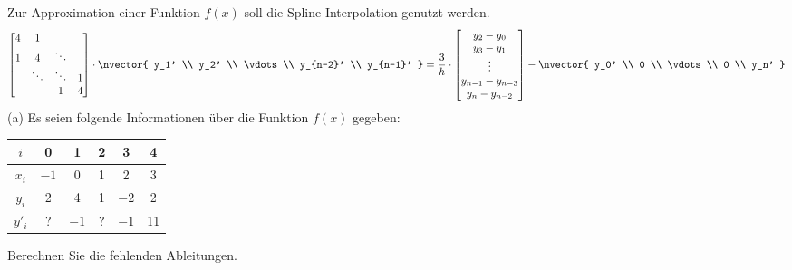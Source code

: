 \documentclass{scrartcl}
\begin{document}



	Zur Approximation einer Funktion $f(x)$ soll die Spline-Interpolation genutzt werden.
	\begin{align}
		\begin{bmatrix}
			4 & 1 \\
			1 & 4 & \ddots\\
			& \ddots & \ddots & 1\\
			&   & 1 & 4
		\end{bmatrix} \cdot
		\nvector{
			y_1' \\ y_2' \\ \vdots \\ y_{n-2}' \\ y_{n-1}'
		}
		= \frac{3}{h} \cdot
		\begin{bmatrix}
			y_2 - y_0 \\
			y_3 - y_1 \\
			\vdots \\
			y_{n-1} - y_{n-3} \\
			y_n - y_{n-2}
		\end{bmatrix} - 
		\nvector{
			y_0' \\ 0 \\ \vdots \\ 0 \\ y_n'
		}
	\end{align}
	\n
	(a)
	Es seien folgende Informationen über die Funktion $f(x)$ gegeben:
	\begin{center}
		\begin{tabular}{cccccc}
			\toprule
			$i$ 	& 0 	& 1 	& 2 	& 3  	& 4 \\ \midrule
			$x_i$	& $-1$ 	& 0 	& 1 	& 2		& 3 \\
			$y_i$	& 2 	& 4 	& 1    	& $-2$	& 2 \\
			$y'_i$  & ?    	& $-1$ 	& ?  	& $-1$ 	& 11 \\
			\bottomrule
		\end{tabular}
	\end{center}
	Berechnen Sie die fehlenden Ableitungen.
\end{document}
